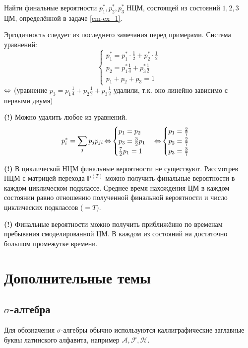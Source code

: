 \begin{exmp}
	Найти финальные вероятности $p_1^*, p_2^*, p_3^*$ НЦМ, состоящей из состояний $1,2,3$ ЦМ, определённой в задаче \ref{cm-ex_1}.
	
	Эргодичность следует из последнего замечания перед примерами. Система уравнений:
	\[
	\begin{cases}
		p_1^* = p_1^* \cdot \frac{1}{2} + p_2^* \cdot \frac{1}{2} \\
		p_2 = p_1^* \frac{1}{4} + p_3^* \frac{1}{2} \\
		p_1 + p_2 + p_3 = 1
	\end{cases}	
	\]
	$\operatorname{\Leftrightarrow}$ (уравнение $p_3 = p_1 \frac{1}{4} + p_2 \frac{1}{2} + p_3 \frac{1}{2}$ удалили, т.к. оно линейно зависимо с первыми двумя)
\end{exmp}
\textbf{(!)} Можно удалить любое из уравнений.
\[ p_i^* = \sum_j p_j p_{ji} \operatorname{\Leftrightarrow} \begin{cases} p_1 = p_2 \\ p_3 = \frac{3}{2} p_1 \\ \frac{7}{2} p_1 = 1 \end{cases} \operatorname{\Leftrightarrow} \begin{cases} p_1 = \frac{2}{7} \\ p_2 = \frac{2}{7} \\ p_3 = \frac{3}{7} \end{cases} \]

\textbf{(!)} В циклической НЦМ финальные вероятности не существуют. Рассмотрев НЦМ с матрицей перехода $\mathbb{P}^{(T)}$ можно получить финальные вероятности в каждом циклическом подклассе. Среднее время нахождения ЦМ в каждом состоянии равно отношению полученной финальной вероятности и число циклических подклассов ($=T$).

\textbf{(!)} Финальные вероятности можно получить приближённо по временам пребывания смоделированной ЦМ. В каждом из состояний на достаточно большом промежутке времени.

\newpage
\section{Дополнительные темы}

\subsection{$\sigma$-алгебра}\label{sigma}

Для обозначения $\sigma$-алгебры обычно используются каллиграфические заглавные буквы латинского алфавита, например $\mathcal{A, F, H}$.

